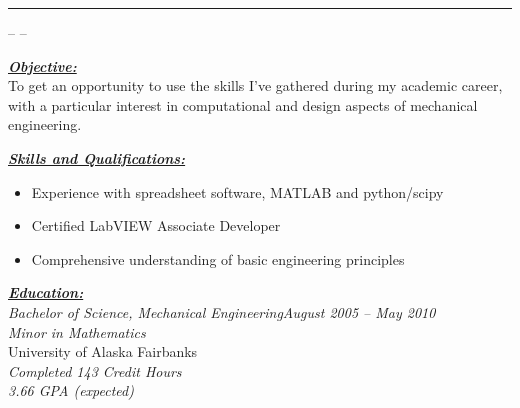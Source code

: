 \documentclass[10pt, letterpaper]{article}
\author{Joshua Holbrook}
\renewcommand{\section}[1]{\bigskip\Large\textbf{\underline{\textit{#1}}}\normalsize\\} %
\begin{document}
\textbf{\Huge \theauthor }\hrule
\smallskip\small \theaddress -- \phonenumber -- \emailaddress \normalsize

\section{Objective:}

\small To get an opportunity to use the skills I've gathered during my academic career,
with a particular interest in computational and design aspects of mechanical
engineering.\normalsize


\section{Skills and Qualifications:}
\small\begin{itemize}
\item Experience with spreadsheet software, MATLAB and python/scipy
\item Certified LabVIEW Associate Developer
\item Comprehensive understanding of basic engineering principles
\end{itemize}\normalsize


\section{Education:}

\large\textit{Bachelor of Science, Mechanical Engineering\hfill August 2005 -- May 2010}\normalsize \\
\textit{Minor in Mathematics}\\
University of Alaska Fairbanks\\
\textit{Completed 143 Credit Hours}\\
\textit{3.66 GPA (expected)}
\end{document}
